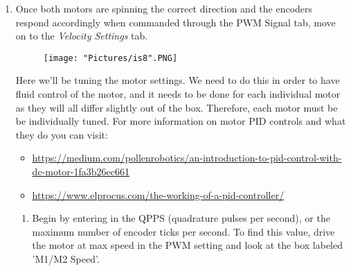 \documentclass[12pt]{article}
\begin{document}
\begin{enumerate}
\begin{enumerate}
		\item Under the control pane, slowly move the slider bar up for Motor1. 		
		\begin{figure}[H]
	 		\centering
			\texttt{[image: "Pictures/is5".PNG]}
	 		\caption{}
		\end{figure}
		\noindent Verify that when the forward signal is sent to the motor (the Motor1 slider is above 0), the wheel spins in the direction that would move the rover as a whole forward (note this is different clockwise vs counterclockwise based on which wheel you are testing). \textbf{If the wheel moves backwards with respect to the rover direction, switch the motor leads coming from the motor controller, which are M1A and M1B.} 

		\item Now as you drive M1 motor forward (which now corresponds to the rover moving forward), verify that M1 Encoder value increases\footnote{If you get no reading values for the encoder, re-check your wiring and connections}. If the encoder value decreases, you have to switch the A and B channels of the encoder signals. These are the EN1 +/- pins on the header pins. 

		\item Repeat steps 7b and 7c for M2 motor. 
	\end{enumerate}
	\item Once both motors are spinning the correct direction and the encoders respond accordingly when commanded through the PWM Signal tab, move on to the \textit{Velocity Settings} tab.	
	
	\begin{figure}[H]
 		\centering
		\texttt{[image: "Pictures/is8".PNG]}
 		\caption{}
	\end{figure}
	\noindent Here we'll be tuning the motor settings. We need to do this in order to have fluid control of the motor, and it needs to be done for each individual motor as they will all differ slightly out of the box.  Therefore, each motor must be be individually tuned. For more information on motor PID controls and what they do you can visit:
	\begin{itemize}
		\item \href{https://medium.com/pollenrobotics/an-introduction-to-pid-control-with-dc-motor-1fa3b26ec661}{https://medium.com/pollenrobotics/an-introduction-to-pid-control-with-dc-motor-1fa3b26ec661}
		\item \href{https://www.elprocus.com/the-working-of-a-pid-controller/}{https://www.elprocus.com/the-working-of-a-pid-controller/}
	\end{itemize}
	\begin{enumerate}
		\item Begin by entering in the QPPS (quadrature pulses per second), or the maximum number of encoder ticks per second. To find this value, drive the motor at max speed in the PWM setting and look at the box labeled 'M1/M2 Speed'.


\end{enumerate}
\end{enumerate}
\end{document}

